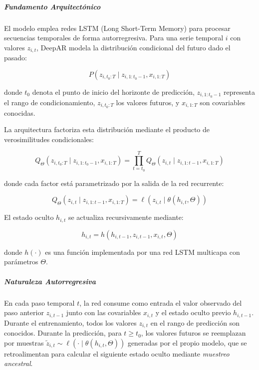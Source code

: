 \subparagraph{Fundamento Arquitectónico}

El modelo emplea redes LSTM (Long Short-Term Memory) para procesar secuencias temporales de forma autorregresiva. Para una serie temporal $i$ con valores $z_{i,t}$, DeepAR modela la distribución condicional del futuro dado el pasado:

\begin{equation}
P(z_{i,t_0:T} \mid z_{i,1:t_0-1}, x_{i,1:T})
\end{equation}

donde $t_0$ denota el punto de inicio del horizonte de predicción, $z_{i,1:t_0-1}$ representa el rango de condicionamiento, $z_{i,t_0:T}$ los valores futuros, y $x_{i,1:T}$ son covariables conocidas.

La arquitectura factoriza esta distribución mediante el producto de verosimilitudes condicionales:

\begin{equation}
Q_{\Theta}(z_{i,t_0:T} \mid z_{i,1:t_0-1}, x_{i,1:T}) = \prod_{t=t_0}^{T} Q_{\Theta}(z_{i,t} \mid z_{i,1:t-1}, x_{i,1:T})
\end{equation}

donde cada factor está parametrizado por la salida de la red recurrente:

\begin{equation}
Q_{\Theta}(z_{i,t} \mid z_{i,1:t-1}, x_{i,1:T}) = \ell(z_{i,t} \mid \theta(h_{i,t}, \Theta))
\end{equation}

El estado oculto $h_{i,t}$ se actualiza recursivamente mediante:

\begin{equation}
h_{i,t} = h(h_{i,t-1}, z_{i,t-1}, x_{i,t}, \Theta)
\end{equation}

donde $h(\cdot)$ es una función implementada por una red LSTM multicapa con parámetros $\Theta$.

\subparagraph{Naturaleza Autorregresiva}

En cada paso temporal $t$, la red consume como entrada el valor observado del paso anterior $z_{i,t-1}$ junto con las covariables $x_{i,t}$ y el estado oculto previo $h_{i,t-1}$. Durante el entrenamiento, todos los valores $z_{i,t}$ en el rango de predicción son conocidos. Durante la predicción, para $t \geq t_0$, los valores futuros se reemplazan por muestras $\tilde{z}_{i,t} \sim \ell(\cdot \mid \theta(h_{i,t}, \Theta))$ generadas por el propio modelo, que se retroalimentan para calcular el siguiente estado oculto mediante \textit{muestreo ancestral}.

